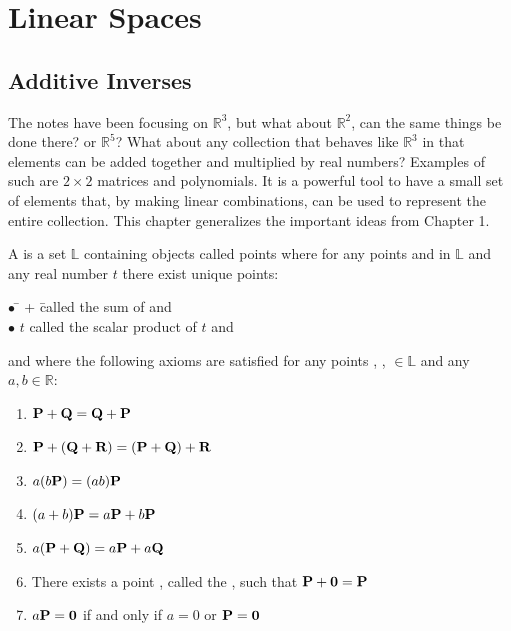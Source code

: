  
\chapter{Linear Spaces}  \label{Linear Spaces}

\section{Additive Inverses}      \label{Additive Inverses}

The notes have been focusing on $\mathbb{R}^3$, but what about $\mathbb{R}^2$, can the same things be done there?  or $\mathbb{R}^5$? What about any collection that behaves like $\mathbb{R}^3$ in that elements can be added together and multiplied by real numbers? Examples of such are $2\times2$ matrices and polynomials. It is a powerful tool to have a small set of elements that, by making linear combinations, can be used to represent the entire collection. This chapter generalizes the important ideas from Chapter 1.  

 
 \begin{defn}
 	A  is a set $\mathbb{L}$ containing objects called points where for any points  and  in $\mathbb{L}$ and any real number $t$ there exist unique points:
 	\begin{tabbing}
 	\indent \quad $\bullet$ \quad \=  +  \quad \= called the sum of  and  \\
 	\indent \quad  $\bullet$ \> $t$ \> called the scalar product of $t$ and  \\
 	\end{tabbing} \vspace{-.25 in}
 	and where the following axioms are satisfied for any points , ,  $\in \mathbb{L}$ and any $a, b \in \mathbb{R}$: 
 	\begin{enumerate}
  		\item $\textbf{P}+\textbf{Q}=\textbf{Q}+\textbf{P}$
 		\item $\textbf{P}+(\textbf{Q}+\textbf{R})=(\textbf{P} + \textbf{Q})+\textbf{R}$
 		\item $a(b\textbf{P}) = (ab)\textbf{P}$
 		\item $(a+b)\textbf{P} = a\textbf{P} + b\textbf{P}$
 		\item $a(\textbf{P}+\textbf{Q}) = a\textbf{P} + a\textbf{Q}$
 		\item There exists a point , called the , such that $\textbf{P}+\textbf{0}=\textbf{P}$
 		\item $a\textbf{P}=\textbf{0}$ if and only if $a=0$ or $\textbf{P}=\textbf{0}$
 	\end{enumerate}
 \end{defn}
 
